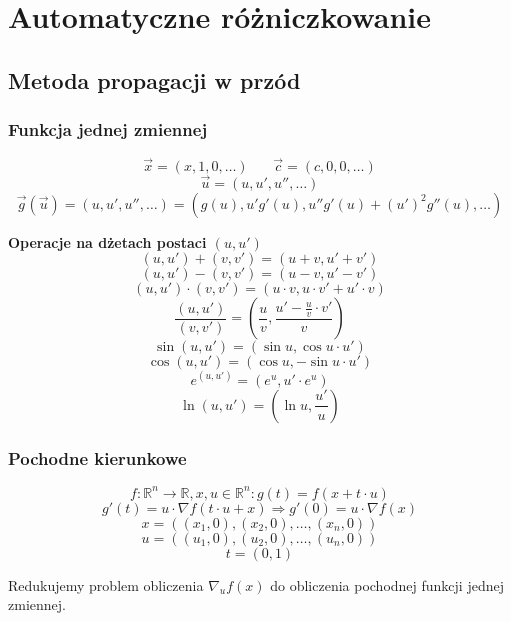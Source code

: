 \documentclass[../mn-notatki.tex]{subfiles}
\begin{document}
\section{Automatyczne różniczkowanie}

\subsection{Metoda propagacji w przód}


\subsubsection{Funkcja jednej zmiennej}
\begin{tcolorbox}
\[
\vec{x} = (x, 1, 0, \ldots) ~~~~~~~~ \vec{c} = (c, 0, 0, \ldots)
\]
\[
\vec{u} = (u, u', u'', \ldots)
\]
\[
\vec{g}(\vec{u}) = (u, u', u'', \ldots)
= (g(u), u'g'(u), u''g'(u) + (u')^2 g''(u), \ldots)
\]
\end{tcolorbox}

\begin{tcolorbox}
\textbf{Operacje na dżetach postaci $(u, u')$}
    $$(u,u') + (v,v') = (u + v, u' + v')$$
    $$(u,u') - (v,v') = (u - v, u' - v')$$
    $$(u,u') \cdot (v,v') = (u \cdot v, u \cdot v' + u' \cdot v)$$
    $$\frac{(u,u')}{(v,v')} = \left(\frac{u}{v}, \frac{u' - \frac{u}{v}\cdot v'}{v}\right)$$
    $$\sin(u,u') = (\sin u, \cos u \cdot u')$$
    $$\cos(u,u') = (\cos u, -\sin u \cdot u')$$
    $$e^{(u,u')} = (e^u, u' \cdot e^u)$$
    $$\ln(u,u') = \left(\ln u, \frac{u'}{u}\right)$$
\end{tcolorbox}

\subsubsection{Pochodne kierunkowe}
\begin{tcolorbox}
\[
f: \mathbb{R}^n \rightarrow \mathbb{R}, x, u \in \mathbb{R}^n:
g(t) = f(x + t \cdot u)
\]
\[
g'(t) = u \cdot \nabla f(t \cdot u + x) \Rightarrow g'(0) = u \cdot \nabla f(x)
\]
\[
x = ((x_1, 0), (x_2, 0), \ldots, (x_n, 0))
\]
\[
u = ((u_1, 0), (u_2, 0), \ldots, (u_n, 0))
\]
\[
t = (0,1)
\]
\end{tcolorbox}
Redukujemy problem obliczenia $\nabla_u f(x)$ do obliczenia pochodnej funkcji
jednej zmiennej.
\end{document}
